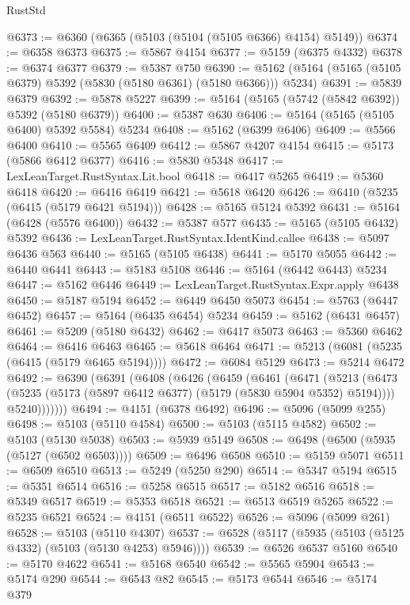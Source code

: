 \begin{lexlean}{RustStd}
\begin{coremodule}
@6373 := @6360 (@6365 (@5103 (@5104 (@5105 @6366) @4154) @5149))
@6374 := @6358 @6373
@6375 := @5867 @4154
@6377 := @5159 (@6375 @4332)
@6378 := @6374 @6377
@6379 := @5387 @750
@6390 := @5162 (@5164 (@5165 (@5105 @6379) @5392 (@5830 (@5180 @6361) (@5180 @6366))) @5234)
@6391 := @5839 @6379
@6392 := @5878 @5227
@6399 := @5164 (@5165 (@5742 (@5842 @6392)) @5392 (@5180 @6379))
@6400 := @5387 @630
@6406 := @5164 (@5165 (@5105 @6400) @5392 @5584) @5234
@6408 := @5162 (@6399 @6406)
@6409 := @5566 @6400
@6410 := @5565 @6409
@6412 := @5867 @4207 @4154
@6415 := @5173 (@5866 @6412 @6377)
@6416 := @5830 @5348
@6417 := LexLeanTarget.RustSyntax.Lit.bool
@6418 := @6417 @5265
@6419 := @5360 @6418
@6420 := @6416 @6419
@6421 := @5618 @6420
@6426 := @6410 (@5235 (@6415 (@5179 @6421 @5194)))
@6428 := @5165 @5124 @5392
@6431 := @5164 (@6428 (@5576 @6400))
@6432 := @5387 @577
@6435 := @5165 (@5105 @6432) @5392
@6436 := LexLeanTarget.RustSyntax.IdentKind.callee
@6438 := @5097 @6436 @563
@6440 := @5165 (@5105 @6438)
@6441 := @5170 @5055
@6442 := @6440 @6441
@6443 := @5183 @5108
@6446 := @5164 (@6442 @6443) @5234
@6447 := @5162 @6446
@6449 := LexLeanTarget.RustSyntax.Expr.apply @6438
@6450 := @5187 @5194
@6452 := @6449 @6450 @5073
@6454 := @5763 (@6447 @6452)
@6457 := @5164 (@6435 @6454) @5234
@6459 := @5162 (@6431 @6457)
@6461 := @5209 (@5180 @6432)
@6462 := @6417 @5073
@6463 := @5360 @6462
@6464 := @6416 @6463
@6465 := @5618 @6464
@6471 := @5213 (@6081 (@5235 (@6415 (@5179 @6465 @5194))))
@6472 := @6084 @5129
@6473 := @5214 @6472
@6492 := @6390
    (@6391
      (@6408
        (@6426
          (@6459
            (@6461
              (@6471
                (@5213
                  (@6473 (@5235 (@5173 (@5897 @6412 @6377) (@5179 (@5830 @5904 @5352) @5194))))
                  @5240)))))))
@6494 := @4151 (@6378 @6492)
@6496 := @5096 (@5099 @255)
@6498 := @5103 (@5110 @4584)
@6500 := @5103 (@5115 @4582)
@6502 := @5103 (@5130 @5038)
@6503 := @5939 @5149
@6508 := @6498 (@6500 (@5935 (@5127 (@6502 @6503))))
@6509 := @6496 @6508
@6510 := @5159 @5071
@6511 := @6509 @6510
@6513 := @5249 (@5250 @290)
@6514 := @5347 @5194
@6515 := @5351 @6514
@6516 := @5258 @6515
@6517 := @5182 @6516
@6518 := @5349 @6517
@6519 := @5353 @6518
@6521 := @6513 @6519 @5265
@6522 := @5235 @6521
@6524 := @4151 (@6511 @6522)
@6526 := @5096 (@5099 @261)
@6528 := @5103 (@5110 @4307)
@6537 := @6528 (@5117 (@5935 (@5103 (@5125 @4332) (@5103 (@5130 @4253) @5946))))
@6539 := @6526 @6537 @5160
@6540 := @5170 @4622
@6541 := @5168 @6540
@6542 := @5565 @5904
@6543 := @5174 @290
@6544 := @6543 @82
@6545 := @5173 @6544
@6546 := @5174 @379

\end{coremodule}
\end{lexlean}
